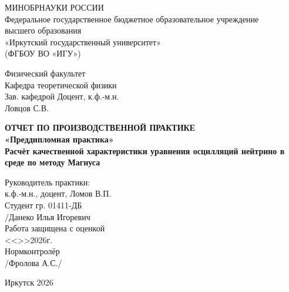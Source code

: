 \documentclass[a4paper,12pt]{article}
\begin{document}
\onehalfspacing
\pagestyle{plain}

\begin{titlepage}
	\begin{center}%
		МИНОБРНАУКИ РОССИИ\\
		Федеральное государственное бюджетное образовательное учреждение\\
		высшего образования \\
		«Иркутский государственный университет»\\
		(ФГБОУ ВО «ИГУ»)\\
	\end{center}
	\vspace*{3em}
	
	\begin{flushright}
		\begin{minipage}{92mm}
			Физический факультет\\
			Кафедра теоретической физики\\
			Зав. кафедрой Доцент, к.ф.-м.н.\\
			Ловцов С.В. \underline{\hspace{35mm}}
		\end{minipage}
	\end{flushright}
	\vspace*{4em}
	
	\begin{center}
		\Large
		\bfseries%
		ОТЧЕТ ПО ПРОИЗВОДСТВЕННОЙ ПРАКТИКЕ\\
		«Преддипломная практика»\\[2ex]
		Расчёт качественной характеристики уравнения осцилляций нейтрино в среде по методу Магнуса
	\end{center}
	
	\vspace*{3em}
	
	\begin{flushright}
		\begin{minipage}{95mm}
			Руководитель практики: \underline{\hspace{35mm}}\\
			к.ф.-м.н., доцент, Ломов В.П.\\[2ex]
			Студент гр. 01411-ДБ\\
			\underline{\hspace{35mm}}/Данеко Илья Игоревич\\[2ex]
			Работа защищена с оценкой \underline{\hspace{30mm}}\\
			<<\underline{\hspace{8mm}}>>\underline{\hspace{22mm}}2026г.\\
			Нормконтролёр\\
			\underline{\hspace{35mm}}/Фролова А.С./\\
		\end{minipage}
	\end{flushright}
	
	\vfill
	\begin{center}
		Иркутск 2026
	\end{center}
\end{titlepage}
\end{document}
